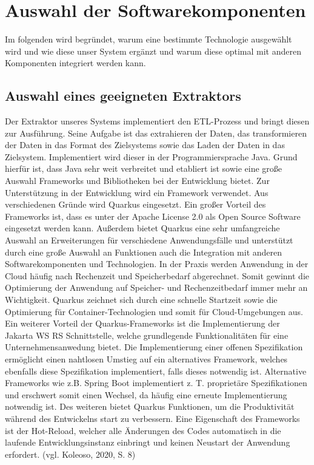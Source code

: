 \section{Auswahl der Softwarekomponenten}
Im folgenden wird begründet, warum eine bestimmte Technologie ausgewählt wird und wie diese unser System ergänzt und warum diese optimal mit anderen Komponenten integriert werden kann.
\subsection{Auswahl eines geeigneten Extraktors}
Der Extraktor unseres Systems implementiert den ETL-Prozess und bringt diesen zur Ausführung. Seine Aufgabe ist das extrahieren der Daten, das transformieren der Daten in das Format des Zielsystems sowie das Laden der Daten in das Zielsystem. Implementiert wird dieser in der Programmiersprache Java. Grund hierfür ist, dass Java sehr weit verbreitet und etabliert ist sowie eine große Auswahl Frameworks und Bibliotheken bei der Entwicklung bietet. Zur Unterstützung in der Entwicklung wird ein Framework verwendet. Aus verschiedenen Gründe wird Quarkus eingesetzt. Ein großer Vorteil des Frameworks ist, dass es unter der Apache License 2.0 als Open Source Software eingesetzt werden kann. Außerdem bietet Quarkus eine sehr umfangreiche Auswahl an Erweiterungen für verschiedene Anwendungsfälle und unterstützt durch eine große Auswahl an Funktionen auch die Integration mit anderen Softwarekomponenten und Technologien. In der Praxis werden Anwendung in der Cloud häufig nach Rechenzeit und Speicherbedarf abgerechnet. Somit gewinnt die Optimierung der Anwendung auf Speicher- und Rechenzeitbedarf immer mehr an Wichtigkeit. Quarkus zeichnet sich durch eine schnelle Startzeit sowie die Optimierung für Container-Technologien und somit für Cloud-Umgebungen aus.\\
Ein weiterer Vorteil der Quarkus-Frameworks ist die Implementierung der Jakarta WS RS Schnittstelle, welche grundlegende Funktionalitäten für eine Unternehmensanwedung bietet. Die Implementierung einer offenen Spezifikation ermöglicht einen nahtlosen Umstieg auf ein alternatives Framework, welches ebenfalls diese Spezifikation implementiert, falls dieses notwendig ist. Alternative Frameworks wie z.B. Spring Boot implementiert z. T. proprietäre Spezifikationen und erschwert somit einen Wechsel, da häufig eine erneute Implementierung notwendig ist. Des weiteren bietet Quarkus Funktionen, um die Produktivität während des Entwickelns start zu verbessern. Eine Eigenschaft des Frameworks ist der Hot-Reload, welcher alle Änderungen des Codes automatisch in die laufende Entwicklungsinstanz einbringt und keinen Neustart der Anwendung erfordert. (vgl. Koleoso, 2020, S. 8)
